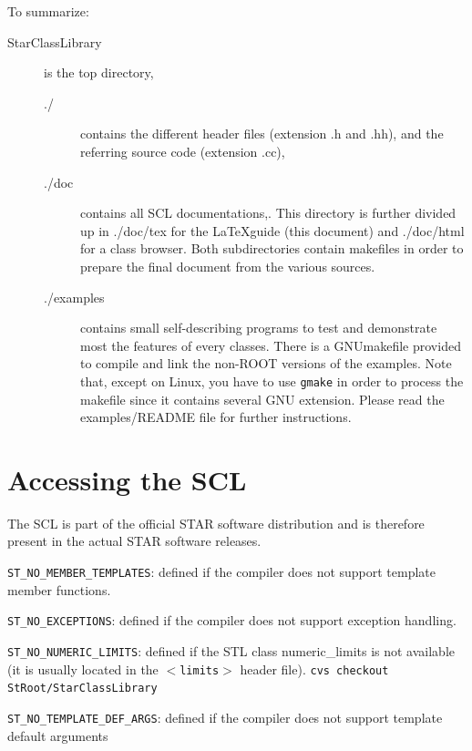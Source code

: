 \documentclass[twoside]{article}
\newcommand{\name}[1]{\textsf{#1}}%
\newcommand{\comp}[1]{\texttt{#1}}%
\begin{document}
To summarize:
\vspace{-11pt}
\begin{description}
\item[\name{StarClassLibrary}] is the top directory,
\begin{description}
\item[\name{./}] contains the different header files
    (extension \name{.h} and \name{.hh}),
and the referring source code (extension \name{.cc}),
\item[\name{./doc}] contains all SCL documentations,. This directory is
    further divided up in \name{./doc/tex} for the \LaTeX guide (this document)
    and \name{./doc/html} for a class browser. Both subdirectories
    contain makefiles in order to prepare the final document from the
    various sources.
\item[\name{./examples}] contains small self-describing programs to test and
    demonstrate most the features of every classes. There is a
    \name{GNUmakefile}
    provided to compile and link the non-ROOT versions of the examples.
    Note that, except on Linux, you have to use \comp{gmake} in order to
    process the makefile since it contains several GNU extension. Please
    read the \name{examples/README} file for further instructions.
\end{description}    
\end{description}

\section{Accessing the SCL}  

The SCL is part of the official STAR software distribution
and is therefore present in the actual STAR software releases.
\item[\comp{ST\_NO\_MEMBER\_TEMPLATES}:] defined if the compiler does not support template
    member functions. 
\item[\comp{ST\_NO\_EXCEPTIONS}:] defined  if the compiler does not support exception
    handling. 
\item[\comp{ST\_NO\_NUMERIC\_LIMITS}:] defined if the STL class \name{numeric\_limits}
    is not available (it is usually located in the $<$\comp{limits}$>$ header file).
    \comp{cvs checkout StRoot/StarClassLibrary}
\item[\comp{ST\_NO\_TEMPLATE\_DEF\_ARGS}:] defined if the compiler does not support
    template default arguments
\end{document}
